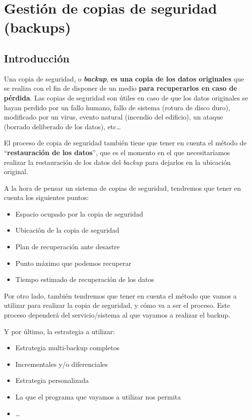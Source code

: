 \chapter{Gestión de copias de seguridad (backups)}

\section{Introducción}

Una copia de seguridad, o \textbf{\textit{backup}}, \textbf{es una copia de los datos originales} que se realiza con el fin de disponer de un medio \textbf{para recuperarlos en caso de pérdida}. Las copias de seguridad son útiles en caso de que los datos originales se hayan perdido por un fallo humano, fallo de sistema (rotura de disco duro), modificado por un virus,  evento natural (incendio del edificio), un ataque (borrado deliberado de los datos), etc…

El proceso de copia de seguridad también tiene que tener en cuenta el método de “\textbf{restauración de los datos}”, que es el momento en el que necesitaríamos realizar la restauración de los datos del \textit{backup} para dejarlos en la ubicación original.

A la hora de pensar un sistema de copias de seguridad, tendremos que tener en cuenta los siguientes puntos:

\begin{itemize}
    \item Espacio ocupado por la copia de seguridad
    \item Ubicación de la copia de seguridad
    \item Plan de recuperación ante desastre
    \item Punto máximo que podemos recuperar
    \item Tiempo estimado de recuperación de los datos
\end{itemize}

Por otro lado, también tendremos que tener en cuenta el método que vamos a utilizar para realizar la copia de seguridad, y cómo va a ser el proceso. Este proceso dependerá del servicio/sistema al que vayamos a realizar el backup.

Y por último, la estrategia a utilizar:

\begin{itemize}
    \item Estrategia multi-backup completos
    \item Incrementales y/o diferenciales
    \item Estrategia personalizada
    \item La que el programa que vayamos a utilizar nos permita
    \item …
\end{itemize}

